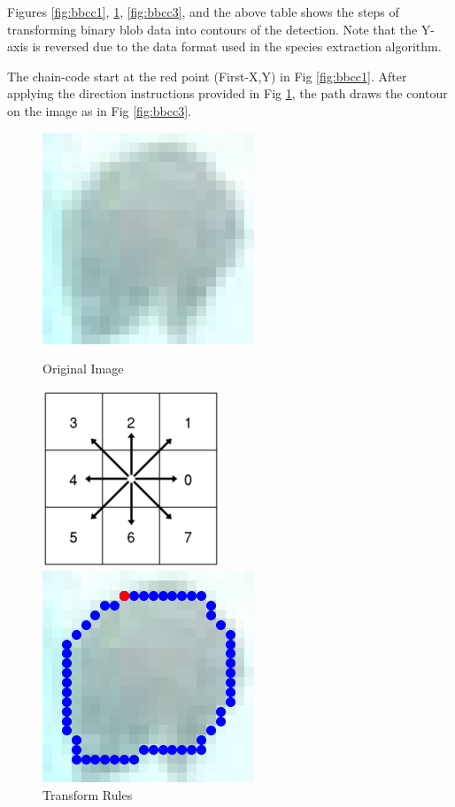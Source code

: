 \documentclass[bsc,logo,twoside,fullspacing,parskip]{infthesis}
\begin{document}
Figures \ref{fig:bbcc1}, \ref{fig:bbcc2}, \ref{fig:bbcc3}, and the above table shows the steps of transforming binary blob data into contours of the detection.
Note that the Y-axis is reversed due to the data format used in the species extraction algorithm. 

The chain-code start at the red point (First-X,Y) in Fig \ref{fig:bbcc1}. 
After applying the direction instructions provided in Fig \ref{fig:bbcc2}, the path draws the contour on the image as in Fig \ref{fig:bbcc3}.

\vspace{-10pt}
\hspace{-40pt}

\begin{figure}[!ht]
	\begin{minipage}[t]{0.3 \linewidth}
		\centering
		\includegraphics[scale=0.3]{graph/bbcc.png}
		\caption{\footnotesize Original Image}
		\label{fig:bbcc1}
	\end{minipage}
	\begin{minipage}[t]{0.35 \linewidth}
		\centering
		\includegraphics[scale=0.4]{graph/bbcctrans.png}
		\caption{ \footnotesize Transform Rules\cite{bbcc}}
		\label{fig:bbcc2}
	\end{minipage}
	\begin{minipage}[t]{0.3 \linewidth}
		\centering
		\includegraphics[scale=0.3]{graph/bbccaplied.png}

\end{minipage}
\end{figure}
\end{document}
